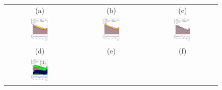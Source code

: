\begin{figure}[H]
\begin{tabular}{@{}ccc@{}}
(a) & (b) & (c) \\
\includegraphics[page=1,width=0.28\textwidth]{figures/pt/tuH_reg1l1tau1b2j_os_log_.pdf}&
\includegraphics[page=1,width=0.28\textwidth]{figures/pt/tuH_reg1l1tau1b3j_os_log_.pdf} &
\includegraphics[page=1,width=0.28\textwidth]{figures/pt/tuH_reg1l2tau1bnj_ss_log_.pdf} \\
(d) & (e) & (f)\\
\includegraphics[page=1,width=0.28\textwidth]{figures/pt/tuH_reg2mtau1b2jos_log_.pdf}&

\end{tabular}
\end{figure}
